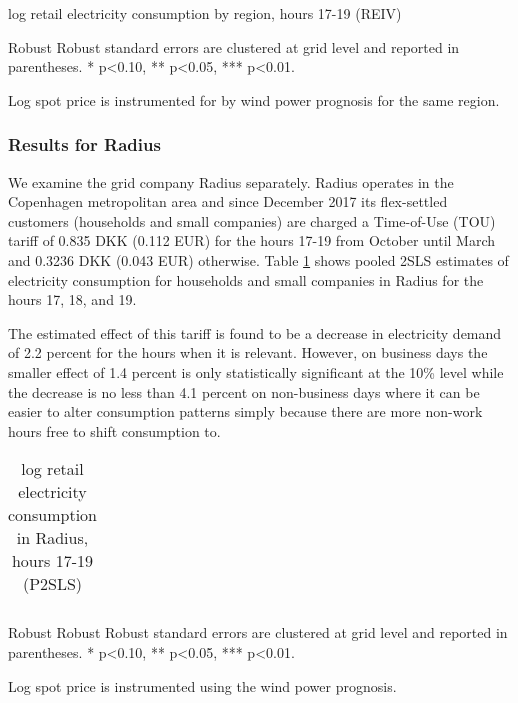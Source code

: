 \begin{table}[H]
\begin{threeparttable}
  \centering
  \caption{log retail electricity consumption by region, hours 17-19 (REIV)}
  \label{tab:r_region}
  \footnotesize
    
    \begin{tablenotes}
    \item Robust Robust standard errors are clustered at grid level and reported in parentheses. * p<0.10, ** p<0.05, *** p<0.01.
    \item Log spot price is instrumented for by wind power prognosis for the same region.
  \end{tablenotes}
\end{threeparttable}
\end{table}
\subsubsection{Results for Radius}
We examine the grid company Radius separately. Radius operates in the Copenhagen metropolitan area and since December 2017 its flex-settled customers (households and small companies) are charged a Time-of-Use (TOU) tariff of 0.835 DKK (0.112 EUR) for the hours 17-19 from October until March and 0.3236 DKK (0.043 EUR) otherwise. Table \ref{tab:r_radius} shows pooled 2SLS estimates of electricity consumption for households and small companies in Radius for the hours 17, 18, and 19.
\par
The estimated effect of this tariff is found to be a decrease in electricity demand of 2.2 percent for the hours when it is relevant. However, on business days the smaller effect of 1.4 percent is only statistically significant at the 10\% level while the decrease is no less than 4.1 percent on non-business days where it can be easier to alter consumption patterns simply because there are more non-work hours free to shift consumption to.
\begin{table}[H]
\centering
\begin{threeparttable}
  \vspace{-0.0cm}
  \caption{log retail electricity consumption in Radius, hours 17-19 (P2SLS)}
  \label{tab:r_radius}
      \footnotesize
  \begin{tabular}{lccc}
        
  \end{tabular}
    \begin{tablenotes}
        \item  Robust Robust Robust standard errors are clustered at grid level and reported in parentheses. * p<0.10, ** p<0.05, *** p<0.01.
         \item Log spot price is instrumented using the wind power prognosis.
    \end{tablenotes}
  \vspace{-0.0cm}
  \end{threeparttable}
\end{table}


